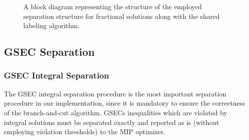 \begin{figure}[ht]
	\centering
	\caption{A block diagram representing the structure
		of the employed separation structure for fractional solutions
		along with the shared labeling algorithm.
	}
	\label{fig:fractional-separation-block-diagram}
\end{figure}

\subsection{GSEC Separation}
\label{sec:impl-gsec-separation}


\subsubsection{GSEC Integral Separation}
\label{sec:impl-gsec-integral-separation}

The GSEC integral separation procedure is the most important
separation procedure in our implementation,
since it is mandatory to ensure the correctness of the branch-and-cut algorithm.
GSECs inequalities which are violated by integral solutions
must be separated exactly and reported as is
(without employing violation thresholds) to the MIP optimizer.

